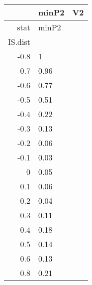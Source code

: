 \begin{table}[ht]
\centering
\begingroup\tiny
\begin{tabular}{rll}
  \hline
 & minP2 & V2 \\ 
  \hline
stat & minP2 &  \\ 
  IS.dist &  &  \\ 
  -0.8 & 1 &  \\ 
  -0.7 & 0.96 &  \\ 
  -0.6 & 0.77 &  \\ 
  -0.5 & 0.51 &  \\ 
  -0.4 & 0.22 &  \\ 
  -0.3 & 0.13 &  \\ 
  -0.2 & 0.06 &  \\ 
  -0.1 & 0.03 &  \\ 
  0 & 0.05 &  \\ 
  0.1 & 0.06 &  \\ 
  0.2 & 0.04 &  \\ 
  0.3 & 0.11 &  \\ 
  0.4 & 0.18 &  \\ 
  0.5 & 0.14 &  \\ 
  0.6 & 0.13 &  \\ 
  0.8 & 0.21 &  \\ 
   \hline
\end{tabular}
\endgroup
\end{table}
